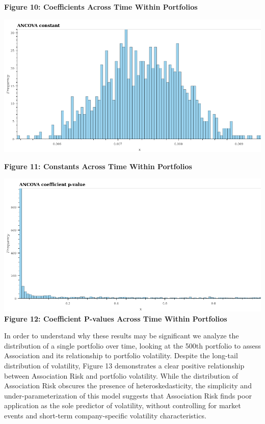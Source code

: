 \documentclass[11pt]{article}
\makeatletter
\def\maxwidth{\ifdim\Gin@nat@width>\linewidth\linewidth
    \else\Gin@nat@width\fi}
\let\Oldincludegraphics\includegraphics
\renewcommand{\includegraphics}[1]{\Oldincludegraphics[width=.8\maxwidth]{#1}}
\makeatother
\begin{document}
\textbf{Figure 10: Coefficients Across Time Within Portfolios}

\includegraphics{../experiments/media/Constant value with constant accross portfolio.png}

\textbf{Figure 11: Constants Across Time Within Portfolios}

\includegraphics{../experiments/media/Coefficeint P-value with contant accross portfolio.png}\\

\textbf{Figure 12: Coefficient P-values Across Time Within Portfolios}

In order to understand why these results may be significant we analyze
the distribution of a single portfolio over time, looking at the 500th
portfolio to assess Association and its relationship to portfolio
volatility. Despite the long-tail distribution of volatility, Figure 13
demonstrates a clear positive relationship between Association Risk and
portfolio volatility. While the distribution of Association Risk
obscures the presence of heteroskedasticity, the simplicity and
under-parameterization of this model suggests that Association Risk
finds poor application as the sole predictor of volatility, without
controlling for market events and short-term company-specific volatility
characteristics.
\end{document}

